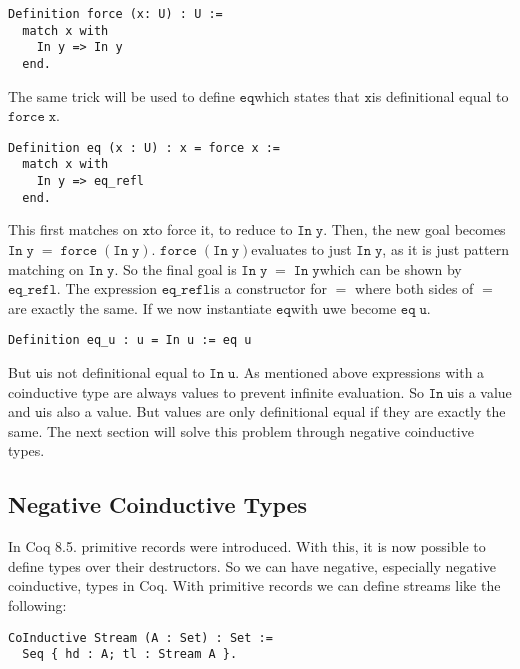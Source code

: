 \documentclass[a4paper,cleardoubleempty,BCOR1cm]{scrbook}
\begin{document}
\begin{verbatim}
Definition force (x: U) : U :=
  match x with
    In y => In y
  end.
\end{verbatim}

The same trick will be used to define $\mathtt{eq}$\;which states that $\mathtt{x}$\;is
definitional equal to $\mathtt{force\;x}$.

\begin{verbatim}
Definition eq (x : U) : x = force x :=
  match x with
    In y => eq_refl
  end.
\end{verbatim}

This first matches on $\mathtt{x}$\;to force it, to reduce to $\mathtt{In\;y}$. Then, the new goal
becomes $\mathtt{In\;y\;=\;force\;(In\;y)}$. $\mathtt{force\;(In\;y)}$\;evaluates to just $\mathtt{In\;y}$, as it
is just pattern matching on $\mathtt{In\;y}$. So the final goal is $\mathtt{In\;y\;=\;In\;y}$\;which
can be shown by $\mathtt{eq\_refl}$. The expression $\mathtt{eq\_refl}$\;is a constructor for $\mathtt{=}$
where both sides of $\mathtt{=}$\;are exactly the same. If we now instantiate $\mathtt{eq}$\;with
$\mathtt{u}$\;we become $\mathtt{eq\;u}$.

\begin{verbatim}
Definition eq_u : u = In u := eq u
\end{verbatim}

But $\mathtt{u}$\;is not definitional equal to $\mathtt{In\;u}$.  As mentioned above expressions
with a coinductive type are always values to prevent infinite evaluation.
So $\mathtt{In\;u}$\;is a value and $\mathtt{u}$\;is also a value.  But values are only
definitional equal if they are exactly the same.  The next section will
solve this problem through negative coinductive types.

\subsection{Negative Coinductive Types}
\label{sec:org125719a}
In Coq 8.5. primitive records were introduced. With this, it is now possible
to define types over their destructors. So we can have negative, especially
negative coinductive, types in Coq. With primitive records we can define
streams like the following:

\begin{verbatim}
CoInductive Stream (A : Set) : Set :=
  Seq { hd : A; tl : Stream A }.
\end{verbatim}
\end{document}
